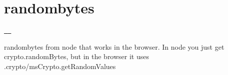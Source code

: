 \chapter{randombytes}
\hypertarget{md_pkiclassroomrescheduler_2src_2main_2frontend_2node__modules_2randombytes_2_r_e_a_d_m_e}{}\label{md_pkiclassroomrescheduler_2src_2main_2frontend_2node__modules_2randombytes_2_r_e_a_d_m_e}
\href{https://www.npmjs.org/package/randombytes}{\texttt{ }} \href{https://travis-ci.org/crypto-browserify/randombytes}{\texttt{ }}

randombytes from node that works in the browser. In node you just get crypto.\+random\+Bytes, but in the browser it uses .crypto/ms\+Crypto.\+get\+Random\+Values


\begin{DoxyCode}{0}
\DoxyCodeLine{\});}

\end{DoxyCode}
 